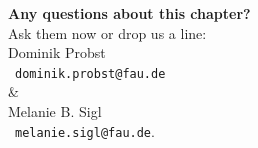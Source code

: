 \begin{frame}[c]
	\begin{center}
		{\bf Any questions about this chapter?}\\[0.5cm]
		Ask them now or drop us a line: \\\bigskip
		Dominik Probst\\
		\faPaperPlane[regular] \ \texttt{dominik.probst@fau.de}\\\smallskip
		\&\\\smallskip
		Melanie B. Sigl\\
		\faPaperPlane[regular] \ \texttt{melanie.sigl@fau.de}.
	\end{center}
\end{frame}

